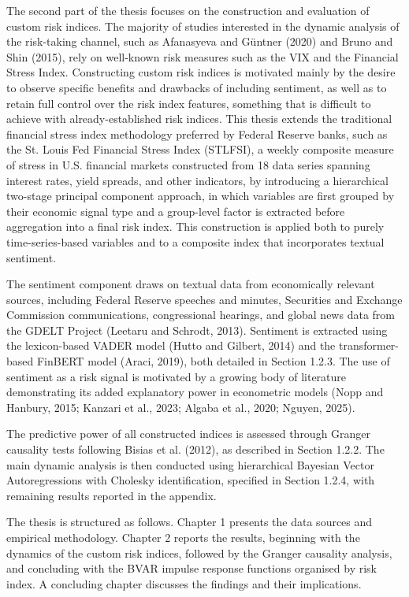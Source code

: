 \documentclass[12pt,a4paper]{report}
\begin{document}
The second part of the thesis focuses on the construction and evaluation of custom risk indices. The majority of studies interested in the dynamic analysis of the risk-taking channel, such as Afanasyeva and Güntner (2020) and Bruno and Shin (2015), rely on well-known risk measures such as the VIX and the Financial Stress Index. Constructing custom risk indices is motivated mainly by the desire to observe specific benefits and drawbacks of including sentiment, as well as to retain full control over the risk index features, something that is difficult to achieve with already-established risk indices. This thesis extends the traditional financial stress index methodology preferred by Federal Reserve banks, such as the St. Louis Fed Financial Stress Index (STLFSI), a weekly composite measure of stress in U.S. financial markets constructed from 18 data series spanning interest rates, yield spreads, and other indicators, by introducing a hierarchical two-stage principal component approach, in which variables are first grouped by their economic signal type and a group-level factor is extracted before aggregation into a final risk index. This construction is applied both to purely time-series-based variables and to a composite index that incorporates textual sentiment. 

The sentiment component draws on textual data from economically relevant sources, including Federal Reserve speeches and minutes, Securities and Exchange Commission communications, congressional hearings, and global news data from the GDELT Project (Leetaru and Schrodt, 2013). Sentiment is extracted using the lexicon-based VADER model (Hutto and Gilbert, 2014) and the transformer-based FinBERT model (Araci, 2019), both detailed in Section 1.2.3. The use of sentiment as a risk signal is motivated by a growing body of literature demonstrating its added explanatory power in econometric models (Nopp and Hanbury, 2015; Kanzari et al., 2023; Algaba et al., 2020; Nguyen, 2025).

The predictive power of all constructed indices is assessed through Granger causality tests following Bisias et al. (2012), as described in Section 1.2.2. The main dynamic analysis is then conducted using hierarchical Bayesian Vector Autoregressions with Cholesky identification, specified in Section 1.2.4, with remaining results reported in the appendix.

The thesis is structured as follows. Chapter 1 presents the data sources and empirical methodology. Chapter 2 reports the results, beginning with the dynamics of the custom risk indices, followed by the Granger causality analysis, and concluding with the BVAR impulse response functions organised by risk index. A concluding chapter discusses the findings and their implications.
\end{document}
